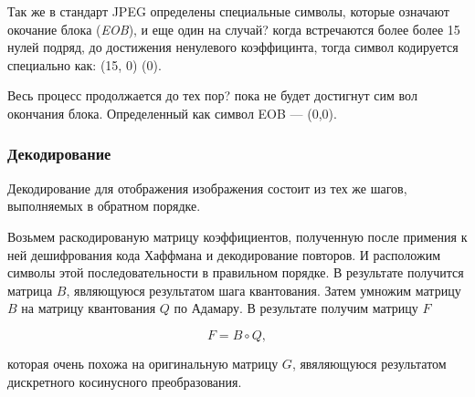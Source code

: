 \documentclass{matmex-diploma-custom}
\begin{document}
Так же в стандарт JPEG определены специальные символы, которые означают окочание блока (\emph{EOB}), и еще один на случай? когда встречаются более более 15 нулей подряд, до достижения ненулевого коэффицинта, тогда символ кодируется специально как: (15, 0) (0).

 Весь процесс продолжается до тех пор? пока не будет достигнут сим вол окончания блока. Определенный как символ  EOB --- (0,0).\\



\subsubsection{Декодирование}

Декодирование для отображения изображения состоит из тех же шагов, выполняемых в обратном порядке.


Возьмем раскодированую матрицу коэффициентов, полученную после примения к ней дешифрования кода Хаффмана и декодирование повторов. И расположим символы этой последовательности в правильном порядке. В результате получится матрица $B$, являющуюся результатом шага квантования.
Затем умножим матрицу $B$ на матрицу квантования $Q$ по Адамару. В результате получим матрицу $F$

$$ F = B \circ Q,$$

которая очень похожа на оригинальную  матрицу $G$, явяляющуюся результатом дискретного косинусного преобразования.

\end{document}
